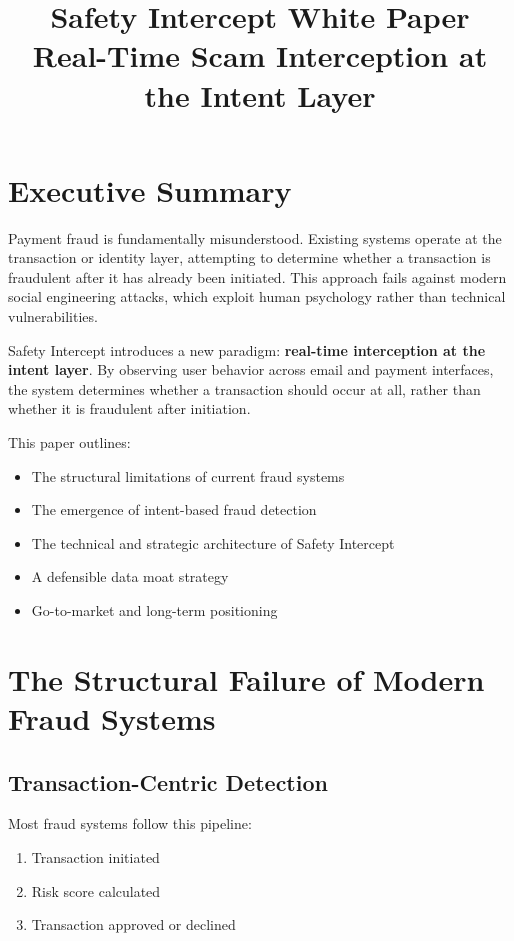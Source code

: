 \documentclass[11pt]{article}
\title{\textbf{Safety Intercept White Paper}\\
\large{Real-Time Scam Interception at the Intent Layer}}
\author{}
\date{}
\begin{document}
\maketitle

\tableofcontents
\newpage

\section{Executive Summary}

Payment fraud is fundamentally misunderstood. Existing systems operate at the transaction or identity layer, attempting to determine whether a transaction is fraudulent after it has already been initiated. This approach fails against modern social engineering attacks, which exploit human psychology rather than technical vulnerabilities.

Safety Intercept introduces a new paradigm: \textbf{real-time interception at the intent layer}. By observing user behavior across email and payment interfaces, the system determines whether a transaction should occur at all, rather than whether it is fraudulent after initiation.

This paper outlines:
\begin{itemize}
    \item The structural limitations of current fraud systems
    \item The emergence of intent-based fraud detection
    \item The technical and strategic architecture of Safety Intercept
    \item A defensible data moat strategy
    \item Go-to-market and long-term positioning
\end{itemize}

\section{The Structural Failure of Modern Fraud Systems}

\subsection{Transaction-Centric Detection}

Most fraud systems follow this pipeline:
\begin{enumerate}
    \item Transaction initiated
    \item Risk score calculated
    \item Transaction approved or declined
\end{enumerate}
\end{document}
